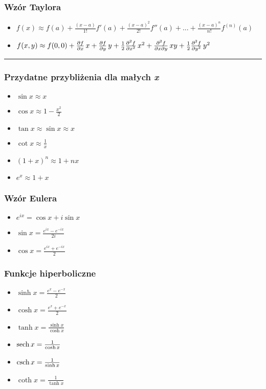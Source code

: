 \documentclass[../main.tex]{subfiles}
\begin{document}
\subsubsection*{Wzór Taylora}
\begin{itemize}
    \item \(f(x)\approx f(a)+\frac{(x-a)}{1!}f'(a)+\frac{(x-a)^2}{2!}f''(a)+...+\frac{(x-a)^n}{n!}f^{(n)}(a)\)
    \item \(f(x,y)\approx f(0,0)+\pdv{f}{x}\,x+\pdv{f}{y}\,y+\frac{1}{2}\pdv[2]{f}{x}\,x^2+\pdv[2]{f}{x}{y}\,xy+\frac{1}{2}\pdv[2]{f}{y}\,y^2\)
\end{itemize}
\noindent\rule{\textwidth}{.5pt}
\begin{multicols}{2}
\subsubsection*{Przydatne przybliżenia dla małych \textit{x}}
\begin{itemize}
    \item \(\sin x\approx x\)
    \item \(\cos x\approx 1-\frac{x^2}{2}\)
    \item \(\tan x\approx \sin x\approx x\)
    \item \(\cot x\approx\frac{1}{x}\)
    \item \((1+x)^n\approx 1+nx\)
    \item \(e^x\approx 1+x\)
\end{itemize}
\subsubsection*{Wzór Eulera}
\begin{itemize}
    \item \(e^{ix}=\cos x+i\sin x\)
    \item \(\sin x=\frac{e^{ix}-e^{-ix}}{2i}\)
    \item \(\cos x=\frac{e^{ix}+e^{-ix}}{2}\)
\end{itemize}
\subsubsection*{Funkcje hiperboliczne}
\begin{itemize}
    \item \(\sinh x=\frac{e^x-e^{-x}}{2}\)
    \item \(\cosh x=\frac{e^x+e^{-x}}{2}\)
    \item \(\tanh x=\frac{\sinh x}{\cosh x}\)
    \item \(\sech x=\frac{1}{\cosh x}\)
    \item \(\csch x=\frac{1}{\sinh x}\)
    \item \(\coth x=\frac{1}{\tanh x}\)
\end{itemize}

\end{multicols}
\end{document}
